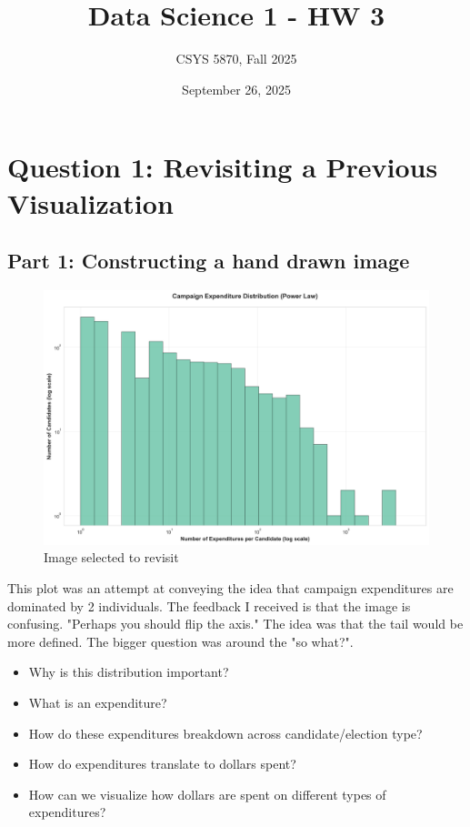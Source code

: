 \documentclass[12pt]{article}
\title{Data Science 1 - HW 3}
\author{CSYS 5870, Fall 2025}
\date{September 26, 2025}
\begin{document}
\maketitle

\section*{Question 1: Revisiting a Previous Visualization}
\subsection*{Part 1: Constructing a hand drawn image}

\begin{figure}[htbp]
    \centering
    \includegraphics[width=0.8\linewidth]{power_law.png}
    \caption{Image selected to revisit}
    \label{fig:myfigure}
\end{figure}

This plot was an attempt at conveying the idea that campaign expenditures are dominated by 2 individuals. The feedback I received is that the image is confusing. "Perhaps you should flip the axis." The idea was that the tail would be more defined. The bigger question was around the "so what?". 

\begin{itemize}
    \item Why is this distribution important?
    \item What is an expenditure?
    \item How do these expenditures breakdown across candidate/election type?
    \item How do expenditures translate to dollars spent?
    \item How can we visualize how dollars are spent on different types of expenditures?
\end{itemize}
\end{document}
